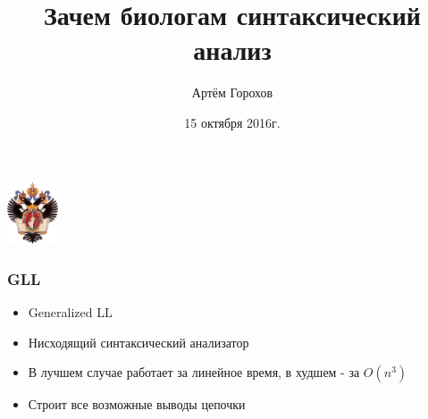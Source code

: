 \documentclass{beamer}
\title[]{Зачем биологам синтаксический анализ}
\institute[СПбГУ]{
    Санкт-Петербургский государственный университет \\
    Лаборатория языковых инструментов JetBrains}
\author[Артём Горохов]{Артём Горохов}
\date{15 октября 2016г.}
\begin{document}
    
    
    \begin{frame}
        \begin{center}
            {\includegraphics[width=1.5cm]{pictures/SPbGU_Logo.png}}
        \end{center}
        \titlepage
    \end{frame}
    
    \begin{frame}
        \frametitle{GLL}
        \begin{itemize}
            \item Generalized LL
            \item Нисходящий синтаксический анализатор
            \item В лучшем случае работает за линейное время, в худшем - за $O(n^{3})$
            \item Строит все возможные выводы цепочки
        \end{itemize}
    \end{frame}
\end{document}
